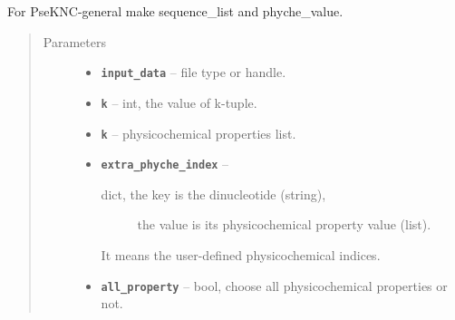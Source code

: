 \documentclass[letterpaper,10pt,english]{sphinxmanual}
\begin{document}
\begin{fulllineitems}
\label{reference/PyDNApsenac:PyDNApsenac.GetSequenceListAndPhycheValue}
For PseKNC-general make sequence\_list and phyche\_value.
\begin{quote}\begin{description}
\item[{Parameters}] \leavevmode\begin{itemize}
\item {} 
\textbf{\texttt{input\_data}} -- file type or handle.

\item {} 
\textbf{\texttt{k}} -- int, the value of k-tuple.

\item {} 
\textbf{\texttt{k}} -- physicochemical properties list.

\item {} 
\textbf{\texttt{extra\_phyche\_index}} -- \begin{description}
\item[{dict, the key is the dinucleotide (string),}] \leavevmode
the value is its physicochemical property value (list).

\end{description}

It means the user-defined physicochemical indices.


\item {} 
\textbf{\texttt{all\_property}} -- bool, choose all physicochemical properties or not.

\end{itemize}

\end{description}\end{quote}

\end{fulllineitems}

\end{document}
